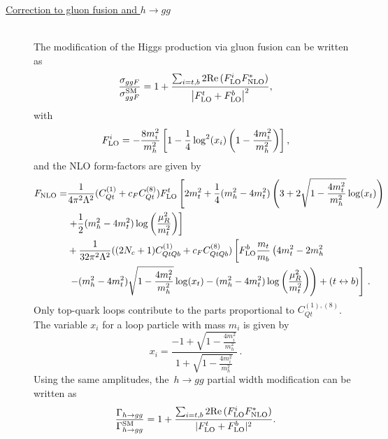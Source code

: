 	\begin{description}
		\item [\underline{Correction to gluon fusion and $h\to gg $ }] \hfill \vspace{0.3cm} \\
		The modification of the Higgs production via gluon fusion can be written as
		\begin{equation}
			\frac{\sigma_{ggF}}{\sigma_{ggF}^{\mathrm{SM}}}= 1+ \frac{ \sum_{i=t,b} 2 \mbox{Re}\,(F_{\textrm{LO}}^i F^*_{\textrm{NLO}})}{\left| F_{\textrm{LO}}^t+F_{\textrm{LO}}^b  \right|^2}, \label{eq:production}
		\end{equation}
		with 
		\begin{equation}
			F_{\textrm{LO}}^i=-\frac{8m_i^2}{m_h^2}\left[1-\frac{1}{4}\log^2(x_i)\left(1-\frac{4m_i^2}{m_h^2}\right)\right],
		\end{equation}
		and the NLO form-factors are given by
		\begin{equation}
			\begin{split}
				F_{\textrm{NLO}}=&\frac{ 1}{4\pi^2  \Lambda^2}(C_{Qt}^{(1)}+c_FC_{Qt}^{(8)})F_{\textrm{LO}}^t \left[ 2 m_t^2  +\frac{1}{4} (m_h^2-4 m_t^2) \left( 3 +2 \sqrt{1-\frac{4 m_t^2}{m_h^2}} \log(x_t) \right)  \right. \\ & \left.
				+\frac{1}{2} (m_h^2-4 m_t^2) \log\left(\frac{\mu_R^2}{m_t^2}\right)\right] \\ & + 
				\frac{1}{32 \pi^2 \Lambda^2} ((2N_c+1)C_{QtQb}^{(1)}+c_FC_{QtQb}^{(8)}) \left[ F_{\textrm{LO}}^b \frac{m_t}{m_b}\left( 4 m_t^2-2 m_h^2 \right. \right.\\ & \left. \left. - (m_h^2-4 m_t^2)\sqrt{1-\frac{4 m_t^2}{m_h^2}} \log(x_t)-(m_h^2-4 m_t^2)\log\left(\frac{\mu_R^2}{m_t^2}\right)\right) +(t\leftrightarrow b)\right]  \,. \label{eq:FNLO}
			\end{split}
		\end{equation}
		Only top-quark loops contribute to the parts proportional to $C_{Qt}^{(1),(8)}$. 
		The variable $x_i$ for a loop particle with mass $m_i$ is given by
		\begin{equation}
			x_i=\frac{-1+\sqrt{1-\frac{4 m_i^2}{m_h^2}}}{1+\sqrt{1-\frac{4 m_i^2}{m_h^2}}}\,. \label{eq:xvariable}
		\end{equation} 
		Using the same amplitudes, the~$ h \to gg$  partial width modification  can be written as
		\begin{equation}
			\frac{\Gamma_{h\to gg}}{\Gamma_{h\to gg}^{\mathrm{SM}}}= 1+ \frac{ \sum_{i=t,b} 2 \mbox{Re}\,(F_{\textrm{LO}}^i F^*_{\textrm{NLO}})}{ |F_{\textrm{LO}}^t+F_{\textrm{LO}}^b|^2}.
		\end{equation}

\end{description}
